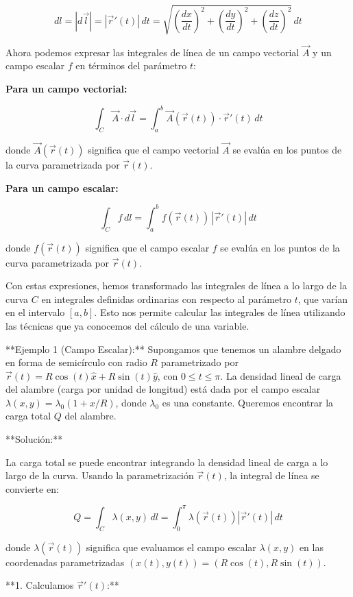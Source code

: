 \documentclass{article}
\begin{document}
\[
dl = |d\vec{l}| = |\vec{r}'(t)| \, dt = \sqrt{\left(\frac{dx}{dt}\right)^2 + \left(\frac{dy}{dt}\right)^2 + \left(\frac{dz}{dt}\right)^2} \, dt
\]

Ahora podemos expresar las integrales de línea de un campo vectorial $\vec{A}$ y un campo escalar $f$ en términos del parámetro $t$:

\textbf{Para un campo vectorial:}

\[
\int_C \vec{A} \cdot d\vec{l} = \int_a^b \vec{A}(\vec{r}(t)) \cdot \vec{r}'(t) \, dt
\]

donde $\vec{A}(\vec{r}(t))$ significa que el campo vectorial $\vec{A}$ se evalúa en los puntos de la curva parametrizada por $\vec{r}(t)$.

\textbf{Para un campo escalar:}

\[
\int_C f \, dl = \int_a^b f(\vec{r}(t)) \, |\vec{r}'(t)| \, dt
\]

donde $f(\vec{r}(t))$ significa que el campo escalar $f$ se evalúa en los puntos de la curva parametrizada por $\vec{r}(t)$.

Con estas expresiones, hemos transformado las integrales de línea a lo largo de la curva $C$ en integrales definidas ordinarias con respecto al parámetro $t$, que varían en el intervalo $[a, b]$. Esto nos permite calcular las integrales de línea utilizando las técnicas que ya conocemos del cálculo de una variable.

**Ejemplo 1 (Campo Escalar):**
Supongamos que tenemos un alambre delgado en forma de semicírculo con radio $R$ parametrizado por $\vec{r}(t) = R\cos(t)\hat{x} + R\sin(t)\hat{y}$, con $0 \le t \le \pi$. La densidad lineal de carga del alambre (carga por unidad de longitud) está dada por el campo escalar $\lambda(x, y) = \lambda_0 (1 + x/R)$, donde $\lambda_0$ es una constante. Queremos encontrar la carga total $Q$ del alambre.

**Solución:**

La carga total se puede encontrar integrando la densidad lineal de carga a lo largo de la curva. Usando la parametrización $\vec{r}(t)$, la integral de línea se convierte en:

\[
Q = \int_C \lambda(x, y) \, dl = \int_0^{\pi} \lambda(\vec{r}(t)) |\vec{r}'(t)| \, dt
\]

donde $\lambda(\vec{r}(t))$ significa que evaluamos el campo escalar $\lambda(x,y)$ en las coordenadas parametrizadas $(x(t), y(t)) = (R\cos(t), R\sin(t))$.

**1. Calculamos $\vec{r}'(t)$:**
\end{document}

